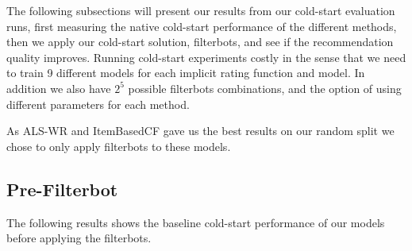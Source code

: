 The following subsections will present our results from our cold-start evaluation runs, first measuring the native cold-start performance
of the different methods, then we apply our cold-start solution, filterbots, and see if the recommendation quality improves.
Running cold-start experiments costly in the sense that we need to train 9 different models for each implicit rating function and model.
In addition we also have $2^5$ possible filterbots combinations, and the option of using different parameters for each method.

As ALS-WR and ItemBasedCF gave us the best results on our random split we chose to only apply filterbots to these models.

\subsection{Pre-Filterbot}

The following results shows the baseline cold-start performance of our models before applying the filterbots.



\begin{table}[H]
\centering
{}
\caption{Cold-start item baselines}
\end{table}

